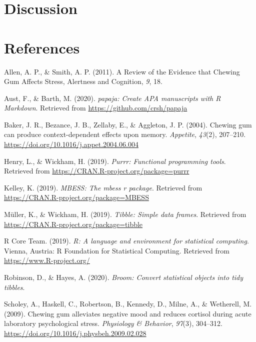 \documentclass[english,jou]{apa6}
\begin{document}
\hypertarget{discussion}{%
\section{Discussion}\label{discussion}}

\newpage

\hypertarget{references}{%
\section{References}\label{references}}

\begingroup
\setlength{\parindent}{-0.5in}
\setlength{\leftskip}{0.5in}

\hypertarget{refs}{}
\leavevmode\hypertarget{ref-allenReviewEvidenceThat2011}{}%
Allen, A. P., \& Smith, A. P. (2011). A Review of the Evidence that Chewing Gum Affects Stress, Alertness and Cognition, \emph{9}, 18.

\leavevmode\hypertarget{ref-R-papaja}{}%
Aust, F., \& Barth, M. (2020). \emph{papaja: Create APA manuscripts with R Markdown}. Retrieved from \url{https://github.com/crsh/papaja}

\leavevmode\hypertarget{ref-bakerChewingGumCan2004}{}%
Baker, J. R., Bezance, J. B., Zellaby, E., \& Aggleton, J. P. (2004). Chewing gum can produce context-dependent effects upon memory. \emph{Appetite}, \emph{43}(2), 207--210. \url{https://doi.org/10.1016/j.appet.2004.06.004}

\leavevmode\hypertarget{ref-R-purrr}{}%
Henry, L., \& Wickham, H. (2019). \emph{Purrr: Functional programming tools}. Retrieved from \url{https://CRAN.R-project.org/package=purrr}

\leavevmode\hypertarget{ref-R-MBESS}{}%
Kelley, K. (2019). \emph{MBESS: The mbess r package}. Retrieved from \url{https://CRAN.R-project.org/package=MBESS}

\leavevmode\hypertarget{ref-R-tibble}{}%
Müller, K., \& Wickham, H. (2019). \emph{Tibble: Simple data frames}. Retrieved from \url{https://CRAN.R-project.org/package=tibble}

\leavevmode\hypertarget{ref-R-base}{}%
R Core Team. (2019). \emph{R: A language and environment for statistical computing}. Vienna, Austria: R Foundation for Statistical Computing. Retrieved from \url{https://www.R-project.org/}

\leavevmode\hypertarget{ref-R-broom}{}%
Robinson, D., \& Hayes, A. (2020). \emph{Broom: Convert statistical objects into tidy tibbles}.

\leavevmode\hypertarget{ref-scholeyChewingGumAlleviates2009}{}%
Scholey, A., Haskell, C., Robertson, B., Kennedy, D., Milne, A., \& Wetherell, M. (2009). Chewing gum alleviates negative mood and reduces cortisol during acute laboratory psychological stress. \emph{Physiology \& Behavior}, \emph{97}(3), 304--312. \url{https://doi.org/10.1016/j.physbeh.2009.02.028}
\end{document}
